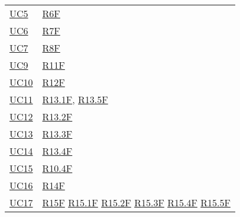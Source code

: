 \begin{center}
\begin{longtable}[!h]{m{50px} m{50px}}
        \hyperref[sec:UC5]{UC5}           & \hyperref[tab:RequisitiFunzionali]{R6F}     \\

        \hyperref[sec:UC6]{UC6}           & \hyperref[tab:RequisitiFunzionali]{R7F}     \\

        \hyperref[sec:UC7]{UC7}           & \hyperref[tab:RequisitiFunzionali]{R8F}     \\

        \hyperref[sec:UC9]{UC9}           & \hyperref[tab:RequisitiFunzionali]{R11F}    \\

        \hyperref[sec:UC10]{UC10}         & \hyperref[tab:RequisitiFunzionali]{R12F}    \\

        \hyperref[sec:UC11]{UC11}         & \hyperref[tab:RequisitiFunzionali]{R13.1F},
        \newline \hyperref[tab:RequisitiFunzionali]{R13.5F}                             \\

        \hyperref[sec:UC12]{UC12}         & \hyperref[tab:RequisitiFunzionali]{R13.2F}  \\

        \hyperref[sec:UC13]{UC13}         & \hyperref[tab:RequisitiFunzionali]{R13.3F}  \\

        \hyperref[sec:UC14]{UC14}         & \hyperref[tab:RequisitiFunzionali]{R13.4F}  \\

        \hyperref[sec:UC15]{UC15}         & \hyperref[tab:RequisitiFunzionali]{R10.4F}  \\

        \hyperref[sec:UC16]{UC16}         & \hyperref[tab:RequisitiFunzionali]{R14F}    \\

        \hyperref[sec:UC17]{UC17}         & \hyperref[tab:RequisitiFunzionali]{R15F}
        \newline \hyperref[tab:RequisitiFunzionali]{R15.1F}
        \newline \hyperref[tab:RequisitiFunzionali]{R15.2F}
        \newline \hyperref[tab:RequisitiFunzionali]{R15.3F}
        \newline \hyperref[tab:RequisitiFunzionali]{R15.4F}
        \newline \hyperref[tab:RequisitiFunzionali]{R15.5F}                             \\


\end{longtable}
\end{center}
